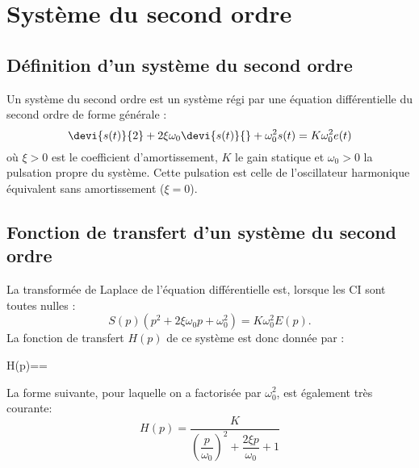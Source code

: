 \clearpage
\pagestyle{empty}
\section*{Système du second ordre}
\subsection*{Définition d'un système du second ordre}
Un système du second ordre est un système régi par une équation 
différentielle du second ordre de forme générale :
\[
\devi{s(t)}{2}+2\xi\omega_0\devi{s(t)}{}+\omega^2_0s(t)=K\omega^2_0e(t)
\]
où $\xi>0$ est le coefficient d'amortissement, $K$ le gain statique et 
$\omega_0>0$ la pulsation propre du système. Cette pulsation est celle de 
l'oscillateur harmonique équivalent sans amortissement ($\xi=0$).
\subsection*{Fonction de transfert d'un système du second ordre}
La transformée de Laplace de l'équation différentielle est, lorsque les CI 
sont toutes nulles :
\[
S(p)\left(p^2+2\xi\omega_0p+\omega^2_0\right)=K\omega^2_0E(p).
\]
La fonction de transfert $H(p)$ de ce système est donc donnée par :
\begin{bequation}
    H(p)==
    \label{eq-2nd_ft}
\end{bequation}
La forme suivante, pour laquelle on a factorisée par $\omega^2_0$, est 
également très courante:
\[
H(p)=\dfrac{K}{\left(\dfrac{p}{\omega_0}\right)^2
    +\dfrac{2\xi p}{\omega_0}+1}
\]
